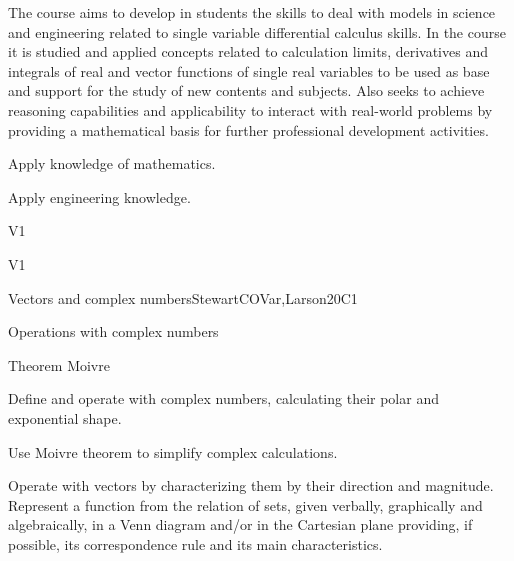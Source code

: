 \begin{syllabus}


\begin{justification}
The course aims to develop in students the skills to deal with models in science and engineering related to single variable differential calculus skills. In the course it is studied and applied concepts related to calculation limits, derivatives and integrals of real and vector functions of single real variables to be used as base and support for the study of new contents and subjects. 
Also seeks to achieve reasoning capabilities and applicability to interact with real-world problems by providing a mathematical basis for further professional development activities.
\end{justification}

\begin{goals}
\item Apply knowledge of mathematics.
\item Apply engineering knowledge.
\end{goals}

\begin{outcomes}{V1}
   \item {}
   \item {}
\end{outcomes}

\begin{competences}{V1}
   \item {}
   \item {}
   \item {}
\end{competences}

\begin{unit}{Vectors and complex numbers}{}{StewartCOVar,Larson}{20}{C1}
   \begin{topics}
      \item Operations with complex numbers
      \item Theorem Moivre
   \end{topics}

   \begin{learningoutcomes}
      \item  Define and operate with complex numbers, calculating their polar and exponential shape.
      \item  Use Moivre theorem to simplify complex calculations.
      \item Operate with vectors by characterizing them by their direction and magnitude.  Represent a function from the relation of sets, given verbally, graphically and algebraically, in a Venn diagram and/or in the Cartesian plane providing, if possible, its correspondence rule and its main characteristics.
   \end{learningoutcomes}
\end{unit}


\end{syllabus}
